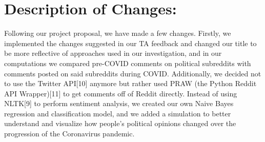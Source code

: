 \documentclass[fontsize=11pt]{article}
\begin{document}
\section*{Description of Changes:}
Following our project proposal, we have made a few changes. Firstly, we implemented the changes suggested in our TA feedback and changed our title to be more reflective of approaches used in our investigation, and in our computations we compared pre-COVID comments on political subreddits with comments posted on said subreddits during COVID. Additionally, we decided not to use the Twitter API[10] anymore but rather used PRAW (the Python Reddit API Wrapper)[11] to get comments off of Reddit directly. Instead of using NLTK[9] to perform sentiment analysis, we created our own Naive Bayes regression and classification model, and we added a simulation to better understand and visualize how people’s political opinions changed over the progression of the Coronavirus pandemic. 
\end{document}
